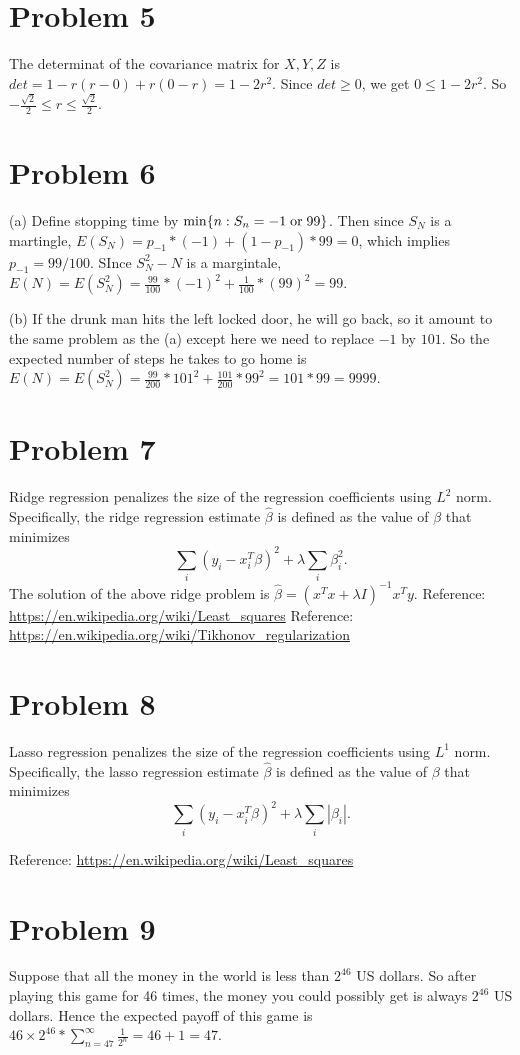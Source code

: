 \documentclass[12pt]{amsart}
\begin{document}
\section{Problem 5}
The determinat of the covariance matrix for $X,Y,Z$ is $det=1-r(r-0)+r(0-r)=1-2r^2$. Since $det\geq 0$, we get $0\leq 1-2r^2$. So $-\frac{\sqrt{2}}{2}\leq r\leq \frac{\sqrt{2}}{2}$. 

\section{Problem 6}
(a) Define stopping time by ${\rm min}\{n:S_n=-1\; {\rm or}\; 99\}$. Then since $S_N$ is a martingle, $E(S_N)=p_{-1}*(-1)+(1-p_{-1})*99=0$, which implies $p_{-1}=99/100$. SInce $S_N^2-N$ is a margintale, $E(N)=E(S_N^2)=\frac{99}{100}*(-1)^2+\frac{1}{100}*(99)^2= 99$. 

(b) If the drunk man hits the left locked door, he will go back, so it amount to the same problem as the (a) except here we need to replace $-1$ by $101$. So the expected number of steps he takes to go home is $E(N)=E(S_N^2)=\frac{99}{200}*101^2+\frac{101}{200}*99^2=101*99=9999$.


\section{Problem 7}
Ridge regression penalizes the size of the regression coefficients using $L^2$ norm.
Specifically, the ridge regression estimate $\hat{\beta}$ is defined as the value of $\beta$ that minimizes
$$\sum_i(y_i-x_i^T\beta)^2+\lambda\sum_i\beta_i^2.$$
The solution of the above ridge problem is $\hat{\beta}=(x^Tx+\lambda I)^{-1}x^Ty$.
Reference: \url{https://en.wikipedia.org/wiki/Least_squares}
Reference: \url{https://en.wikipedia.org/wiki/Tikhonov_regularization}


\section{Problem 8}
Lasso regression penalizes the size of the regression coefficients using $L^1$ norm.
Specifically, the lasso regression estimate $\hat{\beta}$ is defined as the value of $\beta$ that minimizes
$$\sum_i(y_i-x_i^T\beta)^2+\lambda\sum_i|\beta_i|.$$

Reference: \url{https://en.wikipedia.org/wiki/Least_squares}

\section{Problem 9}
Suppose that all the money in the world is less than $2^{46}$ US dollars. So after playing this game for 46 times, the money you could possibly get is always $2^{46}$ US dollars. Hence the expected payoff of this game is $46 \times 2^{46} * \sum_{n=47}^\infty \frac{1}{2^n}=46+1=47$. 
\end{document}
